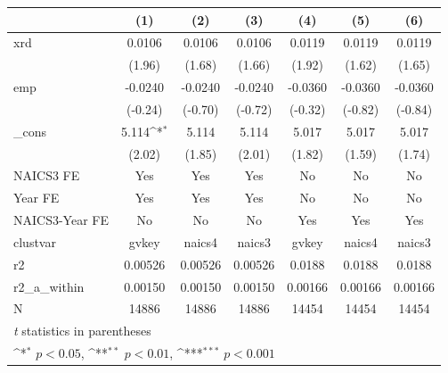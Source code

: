 {
\def\sym#1{\ifmmode^{#1}\else\(^{#1}\)\fi}
\begin{tabular}{l*{6}{c}}
\hline\hline
            &\multicolumn{1}{c}{(1)}         &\multicolumn{1}{c}{(2)}         &\multicolumn{1}{c}{(3)}         &\multicolumn{1}{c}{(4)}         &\multicolumn{1}{c}{(5)}         &\multicolumn{1}{c}{(6)}         \\
\hline
xrd         &      0.0106         &      0.0106         &      0.0106         &      0.0119         &      0.0119         &      0.0119         \\
            &      (1.96)         &      (1.68)         &      (1.66)         &      (1.92)         &      (1.62)         &      (1.65)         \\
[1em]
emp         &     -0.0240         &     -0.0240         &     -0.0240         &     -0.0360         &     -0.0360         &     -0.0360         \\
            &     (-0.24)         &     (-0.70)         &     (-0.72)         &     (-0.32)         &     (-0.82)         &     (-0.84)         \\
[1em]
\_cons      &       5.114\sym{*}  &       5.114         &       5.114         &       5.017         &       5.017         &       5.017         \\
            &      (2.02)         &      (1.85)         &      (2.01)         &      (1.82)         &      (1.59)         &      (1.74)         \\
[1em]
NAICS3 FE   &         Yes         &         Yes         &         Yes         &          No         &          No         &          No         \\
[1em]
Year FE     &         Yes         &         Yes         &         Yes         &          No         &          No         &          No         \\
[1em]
NAICS3-Year FE&          No         &          No         &          No         &         Yes         &         Yes         &         Yes         \\
\hline
clustvar    &       gvkey         &      naics4         &      naics3         &       gvkey         &      naics4         &      naics3         \\
r2          &     0.00526         &     0.00526         &     0.00526         &      0.0188         &      0.0188         &      0.0188         \\
r2\_a\_within &     0.00150         &     0.00150         &     0.00150         &     0.00166         &     0.00166         &     0.00166         \\
N           &       14886         &       14886         &       14886         &       14454         &       14454         &       14454         \\
\hline\hline
\multicolumn{7}{l}{\footnotesize \textit{t} statistics in parentheses}\\
\multicolumn{7}{l}{\footnotesize \sym{*} \(p<0.05\), \sym{**} \(p<0.01\), \sym{***} \(p<0.001\)}\\
\end{tabular}
}
